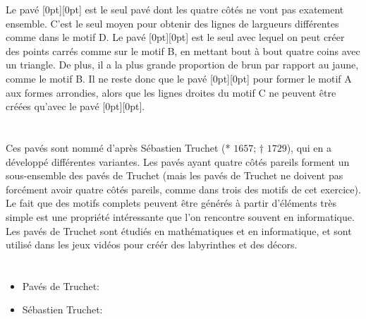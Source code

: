 {{Le pavé \raisebox{-0.5ex}[0pt][0pt]{} est le seul pavé dont les quatre côtés ne vont pas exatement ensemble. C’est le seul moyen pour obtenir des lignes de largueurs différentes comme dans le motif D.
Le pavé \raisebox{-0.5ex}[0pt][0pt]{} est le seul avec lequel on peut créer des points carrés comme sur le motif B, en mettant bout à bout quatre coins avec un triangle. De plus, il a la plus grande proportion de brun par rapport au jaune, comme le motif B.
Il ne reste donc que le pavé \raisebox{-0.5ex}[0pt][0pt]{} pour former le motif A aux formes arrondies, alors que les lignes droites du motif C ne peuvent être créées qu’avec le pavé \raisebox{-0.5ex}[0pt][0pt]{}.



\section*{\BrochureItsInformatics}
Ces pavés sont nommé d’après Sébastien Truchet (* $1657$; † $1729$), qui en a développé différentes variantes. Les pavés ayant quatre côtés pareils forment un sous-ensemble des pavés de Truchet (mais les pavés de Truchet ne doivent pas forcément avoir quatre côtés pareils, comme dans trois des motifs de cet exercice).
Le fait que des motifs complets peuvent être générés à partir d’éléments très simple est une propriété intéressante que l’on rencontre souvent en informatique. Les pavés de Truchet sont étudiés en mathématiques et en informatique, et sont utilisé dans les jeux vidéos pour créér des labyrinthes et des décors.



\section*{\BrochureWebsitesAndKeywords}
{\raggedright
\begin{itemize}
  \item Pavés de Truchet: \href{https://en.wikipedia.org/wiki/Truchet_tiles}{}
  \item Sébastien Truchet: \href{https://fr.wikipedia.org/wiki/S\%C3\%A9bastien_Truchet}{}
\end{itemize}


}}}
